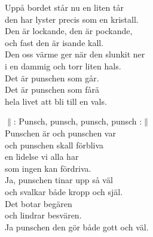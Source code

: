 \documentclass[a6paper,10pt]{article}
\begin{document}
\setlength{\oddsidemargin}{-0.37in}
\noindent
\begin{center}
\end{center}
\begin{lyrics}
Uppå bordet står nu en liten tår\\
den har lyster precis som en kristall.\\
Den är lockande, den är pockande,\\
och fast den är isande kall.\\
Den oss värme ger när den slunkit ner\\
i en dammig och torr liten hals.\\
Det är punschen som går.\\
Det är punschen som fårä\\
hela livet att bli till en vals.
\end{lyrics}
\vspace{40pt}
\begin{center}
\end{center}
\begin{lyrics}
$\|$: Punsch, punsch, punsch, punsch :$\|$
\vspace{5pt}\\
Punschen är och punschen var\\
och punschen skall förbliva\\
en lidelse vi alla har\\
som ingen kan fördriva.
\vspace{5pt}\\
Ja, punschen tinar upp så väl\\
och svalkar både kropp och själ.\\
Det botar begären\\
och lindrar besvären.\\
Ja punschen den gör både gott och väl.
\end{lyrics}
\end{document}
